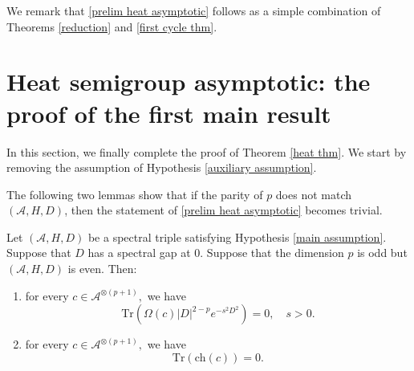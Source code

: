     We remark that \eqref{prelim heat asymptotic} follows as a simple combination of Theorems \ref{reduction} and \ref{first cycle thm}.

\section{Heat semigroup asymptotic: the proof of the first main result}\label{heat section}

    In this section, we finally complete the proof of Theorem \ref{heat thm}. We start by removing the assumption of Hypothesis \ref{auxiliary assumption}.
    
    The following two lemmas show that if the parity of $p$ does not match $(\mathcal{A},H,D)$, then the statement of \eqref{prelim heat asymptotic} becomes trivial.
    \begin{lem}\label{first opposite lemma}
        Let $(\mathcal{A},H,D)$ be a spectral triple satisfying Hypothesis \ref{main assumption}. Suppose that $D$ has a spectral gap at $0$. Suppose that the dimension $p$ is odd but $(\mathcal{A},H,D)$ is even. Then:
        \begin{enumerate}[{\rm (i)}]
            \item\label{first opposite 1} for every $c\in\mathcal{A}^{\otimes (p+1)},$ we have
                \begin{equation*}
                    \mathrm{Tr}(\Omega(c)|D|^{2-p}e^{-s^2D^2})=0,\quad s>0.
                \end{equation*}
            \item\label{first opposite 2} for every $c\in\mathcal{A}^{\otimes (p+1)},$ we have
                \begin{equation*}
                    \mathrm{Tr}(\mathrm{ch}(c))=0.
                \end{equation*}
        \end{enumerate}
    \end{lem}
